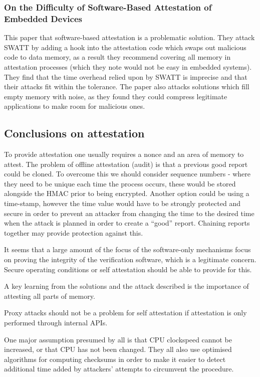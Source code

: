 \subsubsection{On the Difficulty of Software-Based Attestation of Embedded Devices}

This paper \cite{Castelluccia2009} that software-based attestation is a problematic solution. They attack SWATT \cite{Seshadri2004} by adding a hook into the attestation code which swaps out malicious code to data memory, as a result they recommend covering all memory in attestation processes (which they note would not be easy in embedded systems). They find that the time overhead relied upon by SWATT \cite{Seshadri2004} is imprecise and that their attacks fit within the tolerance. The paper also attacks solutions which fill empty memory with noise, as they found they could compress legitimate applications to make room for malicious ones.

\subsection{Conclusions on attestation} \label{attestationConclusion}

To provide attestation one usually requires a nonce and an area of memory to attest. The problem of offline attestation (audit) is that a previous good report could be cloned. To overcome this we should consider sequence numbers - where they need to be unique each time the process occurs, these would be stored alongside the HMAC prior to being encrypted. Another option could be using a time-stamp, however the time value would have to be strongly protected and secure in order to prevent an attacker from changing the time to the desired time when the attack is planned in order to create a ``good'' report. Chaining reports together may provide protection against this.

It seems that a large amount of the focus of the software-only mechanisms focus on proving the integrity of the verification software, which is a legitimate concern. Secure operating conditions or self attestation should  be able to provide for this.

A key learning from the solutions and the attack described is the importance of attesting all parts of memory.

Proxy attacks should not be a problem for self attestation if attestation is only performed through internal APIs.

One major assumption presumed by all is that CPU clockspeed cannot be increased, or that CPU has not been changed. They all also use optimised algorithms for computing checksums in order to make it easier to detect additional time added by attackers' attempts to circumvent the procedure.